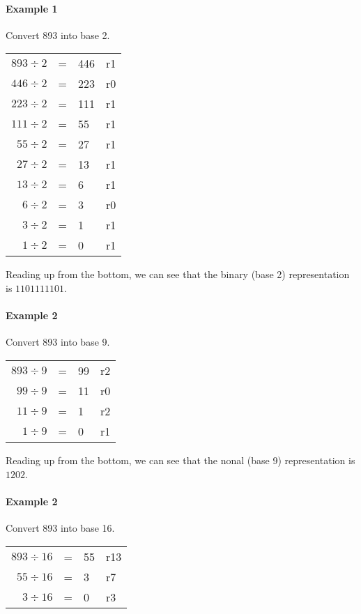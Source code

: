 \paragraph{Example 1}
Convert 893 into base 2.

\begin{center}
	\begin{tabular} {r l l l }
		$893 \div 2$ & = & 446 & r1\\
		$446 \div 2$ & = & 223 & r0\\
		$223 \div 2$ & = & 111 & r1\\
		$111 \div 2$ & = & 55 & r1\\
		$55 \div 2$ & = & 27 & r1\\
		$27 \div 2$ & = & 13 & r1\\
		$13 \div 2$ & = & 6 & r1\\
		$6 \div 2$ & = & 3 & r0\\
		$3 \div 2$ & = & 1 & r1\\
		$1 \div 2$ & = & 0 & r1\\
	\end{tabular}
\end{center}

Reading up from the bottom, we can see that the binary (base 2) representation
is $1101111101$.

\paragraph{Example 2}
Convert 893 into base 9.

\begin{center}
	\begin{tabular} {r l l l }
		$893 \div 9$ & = & 99 & r2\\
		$99 \div 9$ & = & 11 & r0\\
		$11 \div 9$ & = & 1 & r2\\
		$1 \div 9$ & = & 0 & r1\\
	\end{tabular}
\end{center}

Reading up from the bottom, we can see that the nonal (base 9) representation is
$1202$.

\paragraph{Example 2}
Convert 893 into base 16.

\begin{center}
	\begin{tabular} {r l l l }
		$893 \div 16$ & = & 55 & r13\\
		$55 \div 16$ & = & 3 & r7\\
		$3 \div 16$ & = & 0 & r3\\
	\end{tabular}
\end{center}

